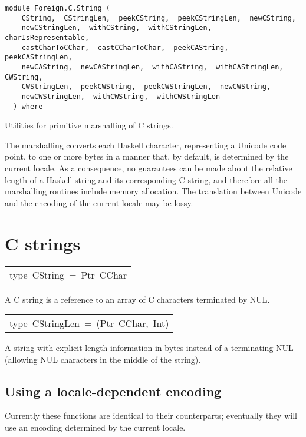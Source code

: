 \label{module:Foreign.C.String}
\haddockbeginheader
{\haddockverb\begin{verbatim}
module Foreign.C.String (
    CString,  CStringLen,  peekCString,  peekCStringLen,  newCString, 
    newCStringLen,  withCString,  withCStringLen,  charIsRepresentable, 
    castCharToCChar,  castCCharToChar,  peekCAString,  peekCAStringLen, 
    newCAString,  newCAStringLen,  withCAString,  withCAStringLen,  CWString, 
    CWStringLen,  peekCWString,  peekCWStringLen,  newCWString, 
    newCWStringLen,  withCWString,  withCWStringLen
  ) where\end{verbatim}}
\haddockendheader

Utilities for primitive marshalling of C strings.
\par
The marshalling converts each Haskell character, representing a Unicode
 code point, to one or more bytes in a manner that, by default, is
 determined by the current locale.  As a consequence, no guarantees
 can be made about the relative length of a Haskell string and its
 corresponding C string, and therefore all the marshalling routines
 include memory allocation.  The translation between Unicode and the
 encoding of the current locale may be lossy.
\par

\section{C strings
}
\begin{haddockdesc}
\item[\begin{tabular}{@{}l}
type\ CString\ =\ Ptr\ CChar
\end{tabular}]\haddockbegindoc
A C string is a reference to an array of C characters terminated by NUL.
\par

\end{haddockdesc}
\begin{haddockdesc}
\item[\begin{tabular}{@{}l}
type\ CStringLen\ =\ (Ptr\ CChar,\ Int)
\end{tabular}]\haddockbegindoc
A string with explicit length information in bytes instead of a
 terminating NUL (allowing NUL characters in the middle of the string).
\par

\end{haddockdesc}
\subsection{Using a locale-dependent encoding
}
Currently these functions are identical to their  counterparts;
 eventually they will use an encoding determined by the current locale.
\par

